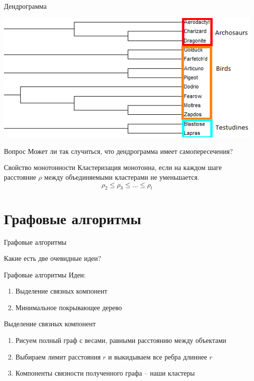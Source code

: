 \documentclass[10pt]{beamer}
\begin{document}
\begin{frame}{Дендрограмма}
  \begin{center}
    \includegraphics[height=0.8 \textheight, width=0.8 \textwidth, keepaspectratio = true]{images/dendrogram1}    
  \end{center}
\end{frame}

\begin{frame}{Вопрос}
  \centering  
  Может ли так случиться, что дендрограмма имеет самопересечения?
\end{frame}

\begin{frame}{Свойство монотонности}
  Кластеризация монотонна, если на каждом шаге расстояние $\rho$ между объединяемыми кластерами не уменьшается.\\
  \bigbreak  
  $$\rho_2 \leq \rho_3 \leq \dots \leq \rho_l$$
\end{frame}

\section{Графовые алгоритмы}

\begin{frame}{Графовые алгоритмы}
  \begin{center}
    Какие есть две очевидные идеи?
  \end{center}    
\end{frame}

\begin{frame}{Графовые алгоритмы}
	Идеи:\\
	\begin{enumerate}
		\item Выделение связных компонент
		\item Минимальное покрывающее дерево
	\end{enumerate}
\end{frame}

\begin{frame}{Выделение связных компонент}
	\begin{enumerate}
		\item Рисуем полный граф с весами, равными расстоянию между объектами
		\item Выбираем лимит расстояния $r$ и выкидываем все ребра длиннее $r$
		\item Компоненты связности полученного графа -- наши кластеры
	\end{enumerate}
\end{frame}
\end{document}
